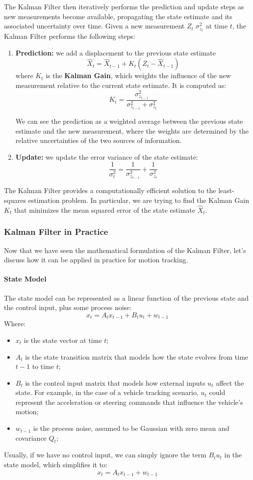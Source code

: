 The Kalman Filter then iteratively performs the prediction and update steps as new measurements become available,
propagating the state estimate and its associated uncertainty over time.
Given a new measurement $Z_t \; \sigma_{z_t}^2$ at time $t$, the Kalman Filter performs the following steps:
\begin{enumerate}
    \item \textbf{Prediction:} we add a displacement to the previous state estimate
    $$\hat{X}_t = \hat{X}_{t-1} + K_t (Z_t - \hat{X}_{t-1})$$
    where $K_t$ is the \textbf{Kalman Gain}, which weights the influence of the new measurement 
    relative to the current state estimate. It is computed as:
    $$K_t = \frac{\sigma_{z_{t-1}}^2}{\sigma_{z_{t-1}}^2 + \sigma_{z_t}^2}$$

    We can see the prediction as a weighted average between the previous state estimate and the new measurement, 
    where the weights are determined by the relative uncertainties of the two sources of information.
     
    \item \textbf{Update:} we update the error variance of the state estimate:
    $$\frac{1}{\sigma_t^2} = \frac{1}{\sigma_{z_{t-1}}^2} + \frac{1}{\sigma_{z_t}^2}$$
\end{enumerate}
The Kalman Filter provides a computationally efficient solution to the least-squares estimation problem. In particular,
we are trying to find the Kalman Gain $K_t$ that minimizes the mean squared error of the state estimate $\hat{X}_t$.

\subsubsection{Kalman Filter in Practice}
Now that we have seen the mathematical formulation of the Kalman Filter, let's discuss how it can be applied in practice for motion tracking.

\paragraph{State Model}
The state model can be represented as a linear function of the previous state and the control input, plus some process noise:
$$x_t = A_t x_{t-1} + B_t u_t + w_{t-1}$$ 
Where:
\begin{itemize}
    \item $x_t$ is the state vector at time $t$;
    \item $A_t$ is the state transition matrix that models how the state evolves from time $t-1$ to time $t$;
    \item $B_t$ is the control input matrix that models how external inputs $u_t$ affect the state. For example,
    in the case of a vehicle tracking scenario, $u_t$ could represent the acceleration or steering commands that influence the vehicle's motion;
    \item $w_{t-1}$ is the process noise, assumed to be Gaussian with zero mean and covariance $Q_t$;
\end{itemize}
Usually, if we have no control input, we can simply ignore the term $B_t u_t$ in the state model, which simplifies it to:
$$x_t = A_t x_{t-1} + w_{t-1}$$

